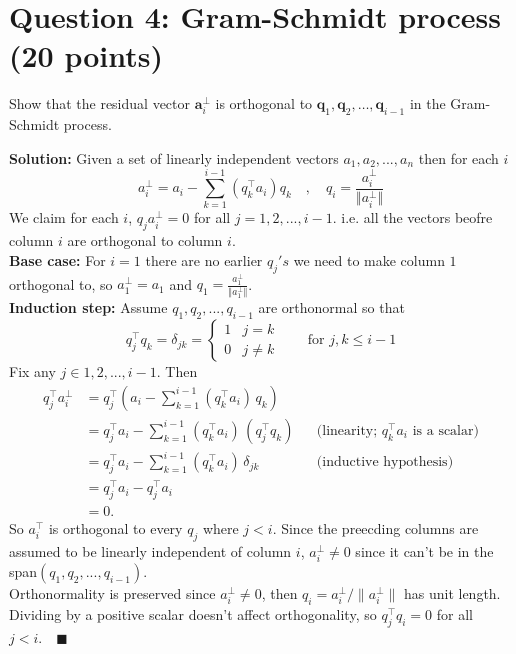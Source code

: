 \documentclass[11pt]{article}
\begin{document}
\newpage
\section*{Question 4: Gram-Schmidt process (20 points)}

Show that the residual vector $\mathbf{a}_i^\perp$ is orthogonal to $\mathbf{q}_1, \mathbf{q}_2, \dots, \mathbf{q}_{i-1}$ in the Gram-Schmidt process.

\textbf{Solution:} Given a set of linearly independent vectors $a_1,a_2,...,a_n$ then for each $i$
$$
a_i^{\perp} = a_i-\sum_{k=1}^{i-1}(q_k^{\top}a_i)q_k \quad , \quad q_i=\frac{a_i^{\perp}}{\Vert a_i^{\perp}\Vert}
$$
We claim for each $i$, $q_ja_i^{\perp}=0$ for all $j=1,2,...,i-1$. i.e. all the vectors beofre column $i$ are orthogonal to column $i$.\\
\textbf{Base case:} For $i=1$ there are no earlier $q_j's$ we need to make column $1$ orthogonal to, so $a_1^{\perp} = a_1$ and $q_1 = \frac{a_1^{\perp}}{\Vert a_1^{\perp}\Vert}$.\\
\textbf{Induction step:} Assume $q_1,q_2,...,q_{i-1}$ are orthonormal so that
$$
q_j^{\top} q_k = \delta_{jk} =
\begin{cases}
1 & j = k \\
0 & j \neq k
\end{cases}
\qquad \text{for } j, k \le i-1
$$
Fix any $j \in {1,2,...,i-1}$. Then
$$
\begin{aligned}
q_j^\top a_i^{\perp} &= q_j^\top \left( a_i - \sum_{k=1}^{i-1} (q_k^\top a_i)\, q_k \right) \\
&= q_j^\top a_i - \sum_{k=1}^{i-1} (q_k^\top a_i)\,(q_j^\top q_k) && \text{(linearity; } q_k^\top a_i \text{ is a scalar)} \\
&= q_j^\top a_i - \sum_{k=1}^{i-1} (q_k^\top a_i)\,\delta_{jk} && \text{(inductive hypothesis)} \\
&= q_j^\top a_i - q_j^\top a_i \\
&= 0.
\end{aligned}
$$
So $a_i^{\top}$ is orthogonal to every $q_j$ where $j<i$. Since the preecding columns are assumed to be linearly independent of column $i$, $a_i^{\perp} \neq 0$ since it can't be in
the span$(q_1,q_2,...,q_{i-1})$.\\
Orthonormality is preserved since $a_i^{\perp} \neq 0$, then $q_i = a_i^{\perp} / \|a_i^{\perp}\|$ has unit length. Dividing by a positive scalar doesn't affect orthogonality, so $q_j^\top q_i = 0$ for all $j < i. \quad \blacksquare$
\bigskip
\end{document}
